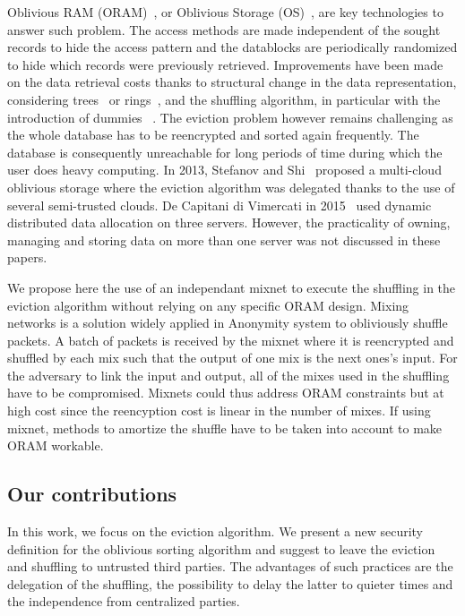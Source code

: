 \documentclass[english,oneside,twocolumn]{article}
\begin{document}
Oblivious RAM (ORAM)~\cite{goldreich87}, or Oblivious Storage (OS)~\cite{boneh2011}, are key technologies to answer such problem. The access methods are made independent of the sought records to hide the access pattern and the datablocks are periodically randomized to hide which records were previously retrieved.
Improvements have been made on the data retrieval costs thanks to structural change in the data representation, considering trees~\cite{stefanov2013path} or rings~\cite{ren2014ring}, and the shuffling algorithm, in particular with the introduction of dummies ~\cite{ohrimenko2014melbourne}.
The eviction problem however remains challenging as the whole database has to be reencrypted and sorted again frequently. The database is consequently unreachable for long periods of time during which the user does heavy computing.
In 2013, Stefanov and Shi~\cite{stefanov2013} proposed a multi-cloud oblivious storage where the eviction algorithm was delegated thanks to the use of several semi-trusted clouds. De Capitani di Vimercati in 2015~\cite{dithree} used dynamic distributed data allocation on three servers.
However, the practicality of owning, managing and storing data on more than one server was not discussed in these papers.

We propose here the use of an independant mixnet to execute the shuffling in the eviction algorithm without relying on any specific ORAM design.
Mixing networks is a solution widely applied in Anonymity system to obliviously shuffle packets. A batch of packets is received by the mixnet where it is reencrypted and shuffled by each mix such that the output of one mix is the next ones's input.
For the adversary to link the input and output, all of the mixes used in the shuffling have to be compromised.
Mixnets could thus address ORAM constraints but at high cost since the reencyption cost is linear in the number of mixes. If using mixnet, methods to amortize the shuffle have to be taken into account to make ORAM workable.

\subsection{Our contributions}
In this work, we focus on the eviction algorithm. We present a new security definition for the oblivious sorting algorithm and suggest to leave the eviction and shuffling to untrusted third parties.
The advantages of such practices are the delegation of the shuffling, the possibility to delay the latter to quieter times and the independence from centralized parties.
\end{document}
